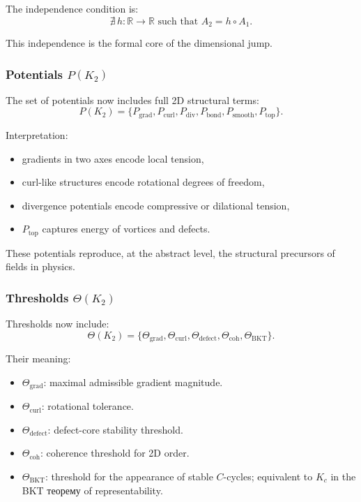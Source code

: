 The independence condition is:
\[
\nexists\, h: \mathbb{R} \to \mathbb{R} \text{ such that } A_2 = h \circ A_1.
\]

This independence is the formal core of the dimensional jump.

\subsubsection{Potentials \texorpdfstring{$P(K_2)$}{P(K_2)}}

The set of potentials now includes full 2D structural terms:
\[
P(K_2) = 
\{ P_{\mathrm{grad}}, P_{\mathrm{curl}}, P_{\mathrm{div}},
   P_{\mathrm{bond}}, P_{\mathrm{smooth}}, P_{\mathrm{top}} \}.
\]

Interpretation:
\begin{itemize}
    \item gradients in two axes encode local tension,
    \item curl-like structures encode rotational degrees of freedom,
    \item divergence potentials encode compressive or dilational tension,
    \item $P_{\mathrm{top}}$ captures energy of vortices and defects.
\end{itemize}

These potentials reproduce, at the abstract level, the structural
precursors of fields in physics.

\subsubsection{Thresholds \texorpdfstring{$\Theta(K_2)$}{\Theta(K_2)}}

Thresholds now include:
\[
\Theta(K_2) =
\{\Theta_{\mathrm{grad}}, \Theta_{\mathrm{curl}},
  \Theta_{\mathrm{defect}}, \Theta_{\mathrm{coh}},
  \Theta_{\mathrm{BKT}}\}.
\]

Their meaning:
\begin{itemize}
    \item $\Theta_{\mathrm{grad}}$: maximal admissible gradient magnitude.
    \item $\Theta_{\mathrm{curl}}$: rotational tolerance.
    \item $\Theta_{\mathrm{defect}}$: defect-core stability threshold.
    \item $\Theta_{\mathrm{coh}}$: coherence threshold for 2D order.
    \item $\Theta_{\mathrm{BKT}}$: threshold for the appearance of
          stable $C$-cycles; equivalent to $K_c$ in the BKT теорему of
          representability.
\end{itemize}

